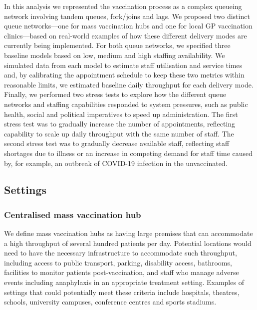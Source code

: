 \documentclass{article}
\begin{document}
In this analysis we represented the vaccination process as a complex
queueing network involving tandem queues, fork/joins and lags. We
proposed two distinct queue networks---one for mass vaccination hubs and
one for local GP vaccination clinics---based on real-world examples of
how these different delivery modes are currently being implemented. For
both queue networks, we specified three baseline models based on low,
medium and high staffing availability. We simulated data from each model
to estimate staff utilisation and service times and, by calibrating the
appointment schedule to keep these two metrics within reasonable limits,
we estimated baseline daily throughput for each delivery mode. Finally,
we performed two stress tests to explore how the different queue
networks and staffing capabilities responded to system pressures, such
as public health, social and political imperatives to speed up
administration. The first stress test was to gradually increase the
number of appointments, reflecting capability to scale up daily
throughput with the same number of staff. The second stress test was to
gradually decrease available staff, reflecting staff shortages due to
illness or an increase in competing demand for staff time caused by, for
example, an outbreak of COVID-19 infection in the unvaccinated.

\hypertarget{settings}{%
\subsection{Settings}\label{settings}}

\hypertarget{centralised-mass-vaccination-hub}{%
\subsubsection{Centralised mass vaccination
hub}\label{centralised-mass-vaccination-hub}}

We define mass vaccination hubs as having large premises that can
accommodate a high throughput of several hundred patients per day.
Potential locations would need to have the necessary infrastructure to
accommodate such throughput, including access to public transport,
parking, disability access, bathrooms, facilities to monitor patients
post-vaccination, and staff who manage adverse events including
anaphylaxis in an appropriate treatment setting. Examples of settings
that could potentially meet these criteria include hospitals, theatres,
schools, university campuses, conference centres and sports stadiums.
\end{document}
